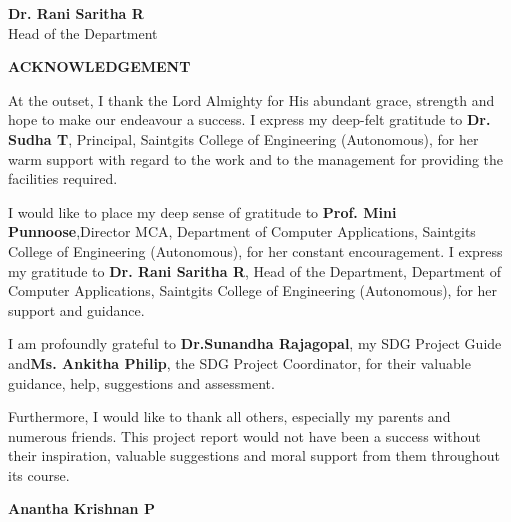 \documentclass[12pt,a4paper]{report}
\begin{document}
\noindent
\begin{center}
\begin{minipage}{0.45\textwidth}
\centering
\textbf{Dr. Rani Saritha R}\\
Head of the Department
\end{minipage}
\end{center}

\vspace{1.8cm}


\newpage
\thispagestyle{empty}

\begin{center}
\fontsize{16pt}{18pt}\selectfont
\textbf{ACKNOWLEDGEMENT}
\end{center}

\vspace{1cm}

At the outset, I thank the Lord Almighty for His abundant grace, strength and hope to make our endeavour a success. I express my deep-felt gratitude to \textbf{Dr. Sudha T}, Principal, Saintgits College of Engineering (Autonomous), for her warm support with regard to the work and to the management for providing the facilities required.

I would like to place my deep sense of gratitude to \textbf{Prof. Mini Punnoose},\linebreak Director MCA, Department of Computer Applications, Saintgits College of Engineering (Autonomous), for her constant encouragement. I express my gratitude to \linebreak\textbf{Dr. Rani Saritha R}, Head of the Department, Department of Computer Applications, Saintgits College of Engineering (Autonomous), for her support and guidance.

I am profoundly grateful to \textbf{Dr.Sunandha Rajagopal}, my SDG Project Guide and\linebreak\textbf{Ms. Ankitha Philip}, the SDG Project Coordinator, for their valuable guidance, help, suggestions and assessment.

Furthermore, I would like to thank all others, especially my parents and numerous friends. This project report would not have been a success without their inspiration, valuable suggestions and moral support from them throughout its course.

\vspace{2cm}

\begin{flushright}
\textbf{Anantha Krishnan P}
\end{flushright}
\end{document}
